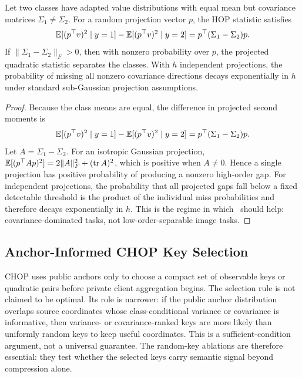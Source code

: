 \begin{theorem}
Let two classes have adapted value distributions with equal mean but covariance matrices \(\Sigma_1\neq\Sigma_2\). For a random projection vector \(p\), the HOP statistic satisfies
\begin{equation}
    \mathbb{E}[(p^\top v)^2\mid y=1]
    -
    \mathbb{E}[(p^\top v)^2\mid y=2]
    =
    p^\top(\Sigma_1-\Sigma_2)p.
\end{equation}
If \(\|\Sigma_1-\Sigma_2\|_F>0\), then with nonzero probability over \(p\), the projected quadratic statistic separates the classes. With \(h\) independent projections, the probability of missing all nonzero covariance directions decays exponentially in \(h\) under standard sub-Gaussian projection assumptions.
\end{theorem}

\begin{proof}
Because the class means are equal, the difference in projected second moments is
\begin{equation}
    \mathbb{E}[(p^\top v)^2\mid y=1]-\mathbb{E}[(p^\top v)^2\mid y=2]
    =p^\top(\Sigma_1-\Sigma_2)p.
\end{equation}
Let \(A=\Sigma_1-\Sigma_2\). For an isotropic Gaussian projection, \(\mathbb{E}[(p^\top A p)^2]=2\|A\|_F^2+(\mathrm{tr}\,A)^2\), which is positive when \(A\neq0\). Hence a single projection has positive probability of producing a nonzero high-order gap. For independent projections, the probability that all projected gaps fall below a fixed detectable threshold is the product of the individual miss probabilities and therefore decays exponentially in \(h\). This is the regime in which \hopmethod\ should help: covariance-dominated tasks, not low-order-separable image tasks.
\end{proof}

\subsection{Anchor-Informed CHOP Key Selection}

CHOP uses public anchors only to choose a compact set of observable keys or quadratic pairs before private client aggregation begins. The selection rule is not claimed to be optimal. Its role is narrower: if the public anchor distribution overlaps source coordinates whose class-conditional variance or covariance is informative, then variance- or covariance-ranked keys are more likely than uniformly random keys to keep useful coordinates. This is a sufficient-condition argument, not a universal guarantee. The random-key ablations are therefore essential: they test whether the selected keys carry semantic signal beyond compression alone.

